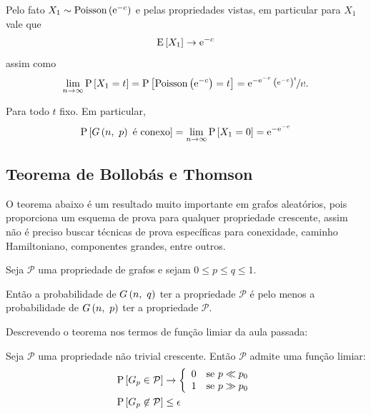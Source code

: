 Pelo fato $X_1\sim\mathrm{Poisson}\left(\mathrm{e}^{-c}\vphantom{1j}\right)$ e pelas propriedades vistas, em particular para $X_1$ vale que
\[
  \mathrm{E}\left[X_1\vphantom{1j}\right]\rightarrow\mathrm{e}^{-c}
\]
assim como
\[
  \lim_{n\rightarrow\infty} \mathrm{P}\left[X_1=t\vphantom{1j}\right]
    = \mathrm{P}\left[\mathrm{Poisson}\left(\mathrm{e}^{-c}\vphantom{1j}\right)=t\vphantom{1j}\right]
    = \mathrm{e}^{-\mathrm{e}^{-c}}\,\nicefrac{\left(\mathrm{e}^{-c}\vphantom{1j}\right)^t}{t!}.
\]

Para todo $t$ fixo. Em particular,
\[
  \mathrm{P}\left[G\left(n,\ p\vphantom{1j}\right) \text{ é conexo}\vphantom{1j}\right] = \lim_{n\rightarrow\infty} \mathrm{P}\left[X_1=0\vphantom{1j}\right]=\mathrm{e}^{-\mathrm{e}^{-c}}
\]

\subsection{Teorema de Bollobás e Thomson}

O teorema abaixo é um resultado muito importante em grafos aleatórios, pois proporciona um esquema de prova para qualquer propriedade crescente, assim não é preciso buscar técnicas de prova específicas para conexidade, caminho Hamiltoniano, componentes grandes, entre outros.

\begin{definicao}
  Seja $\mathcal{P}$ uma propriedade de grafos e sejam $0\leq p\leq q\leq1$.

  Então a probabilidade de $G\left(n,\ q\vphantom{1j}\right)$ ter a propriedade $\mathcal{P}$ é pelo menos a probabilidade de $G\left(n,\ p\vphantom{1j}\right)$ ter a propriedade $\mathcal{P}$.
\end{definicao}

Descrevendo o teorema nos termos de função limiar da aula passada:

\begin{teorema}[B-Th'87]
  Seja $\mathcal{P}$ uma propriedade não trivial crescente. Então $\mathcal{P}$ admite uma função limiar:
  \vspace*{-\baselineskip}
  \begin{align*}
    \mathrm{P}\left[G_p\in\mathcal{P}\vphantom{1j}\right]
      &\rightarrow \left\{\begin{array}{ll}
                      0 & \text{se } p \ll p_0  \\
                      1 & \text{se } p \gg p_0  \\
                    \end{array}\vphantom{1j}\right. \\
    \mathrm{P}\left[G_p\not\in\mathcal{P}\vphantom{1j}\right]
      &\leq\epsilon
  \end{align*}
\end{teorema}

